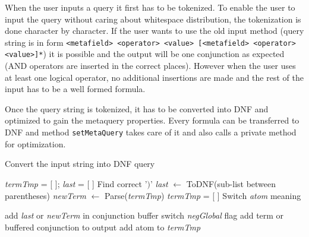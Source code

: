 
When the user inputs a query it first has to be tokenized. To enable the user to input the query without caring 
about whitespace distribution, the tokenization is done character by character.
If the user wants to use the old input method (query string is in form 
\texttt{<metafield> <operator> <value> [<metafield> <operator> <value>]*})
it is possible and the output will be one conjunction as expected (AND operators are inserted in the
correct places). However when the user uses at least one logical operator, no additional insertions are made
and the rest of the input has to be a well formed formula. 

Once the query string is tokenized, it has to be converted into DNF and optimized to gain the metaquery 
properties. Every formula can be transferred to DNF and  method \texttt{setMetaQuery} takes care of it and also 
calls a private method for optimization.

\begin{algorithm}[h]
\caption{Convert the input string into DNF query}
\begin{algorithmic}[1]
\State \textit{termTmp} = [ ]; \textit{last} = [ ]
		\State Find correct '$)$'
		\State \textit{last} $\leftarrow$ ToDNF(sub-list between parentheses)
			\State \textit{newTerm} $\leftarrow$ Parse(\textit{termTmp})
			\State \textit{termTmp} = [ ]
			\State Switch \textit{atom} meaning
		\EndIf
		
			\State add \textit{last} or \textit{newTerm} in conjunction buffer
			\State switch \textit{negGlobal} flag
		\Else{}
			\State add term or buffered conjunction to output
		\EndIf
	\Else
		\State add atom to \textit{termTmp}
	\EndIf
\EndFor
\EndProcedure
\end{algorithmic}
\end{algorithm}


